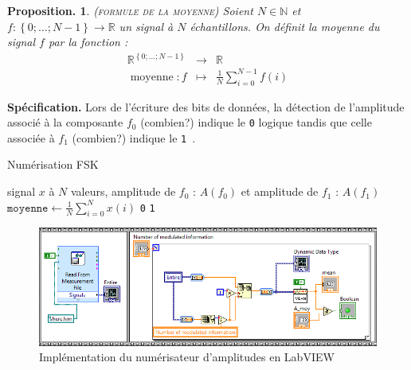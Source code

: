 \documentclass[twocolumn,pre,floats,aps,amsmath,amssymb]{revtex4}
\newtheorem{proposition}[theorem]{Proposition.}
\newenvironment{remark}[1][Remarque.]{\begin{trivlist}
\item[\hskip \labelsep {\bfseries #1}]}{\end{trivlist}}
\begin{document}
\begin{proposition}
  \textsc{(formule de la moyenne)}
  Soient $N \in \mathbb{N}$ et $f : \left \{ 0 ; \dots ; N - 1 \right \} \rightarrow \mathbb{R}$ un signal \`a $N$ \'echantillons. On d\'efinit la moyenne du signal $f$ par la fonction :
  \begin{eqnarray*}
    \mathbb{R}^{\left \{ 0 ; \dots ; N - 1 \right \}} &\rightarrow& \mathbb{R}\\
    \operatorname{moyenne} : f &\mapsto& \frac{1}{N}\sum^{N - 1}_{i = 0}{f(i)}
  \end{eqnarray*}
\end{proposition}

\noindent
\textbf{Sp\'ecification.}
  Lors de l'\'ecriture des bits de donn\'ees, la d\'etection de l'amplitude associ\'e \`a la composante $f_0$ (combien?) indique le \texttt{0} logique tandis que celle associ\'ee \`a $f_1$ (combien?) indique le \texttt{1}~\cite{Comment1}.

\begin{algorithm}[h]
\caption{Num\'erisation FSK}
\label{algo_numerisation_FSK}
\begin{algorithmic}[1]
  \REQUIRE signal $x$ \`a $N$ valeurs, amplitude de $f_0$ : $A(f_0)$ et amplitude de $f_1$ : $A(f_1)$
  \STATE $\texttt{moyenne} \leftarrow \frac{1}{N}\sum^N_{i = 0}{x(i)}$
  \RETURN \texttt{0}
  \ELSE
  \RETURN \texttt{1}
  \ENDIF
\end{algorithmic}
\end{algorithm}


\begin{figure}[]
  \includegraphics[width=15cm]{numerisation_amplitude.PNG}
\caption{Impl\'ementation du num\'erisateur d'amplitudes en LabVIEW}
\label{fig:algo_numerisation_FSK_labview}
\end{figure}

\end{document}
